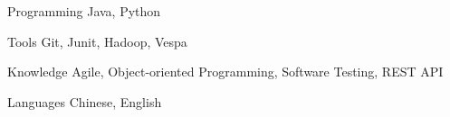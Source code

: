 

\begin{cvskills}

  \cvskill
    {Programming} %
    {Java, Python} %

  \cvskill
    {Tools} %
    {Git, Junit, Hadoop, Vespa} %

  \cvskill
    {Knowledge} %
    {Agile, Object-oriented Programming, Software Testing, REST API} %

  \cvskill
    {Languages} %
    {Chinese, English} %

\end{cvskills}
